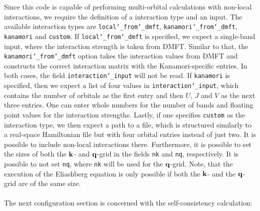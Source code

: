 \documentclass[../../main.tex]{subfiles}
\begin{document}
Since this code is capable of performing multi-orbital calculations with non-local interactions, we require the definition of a interaction type and an input. The available interaction types are \texttt{local\char`_from\char`_dmft}, \texttt{kanamori\char`_from\char`_dmft}, \texttt{kanamori} and \texttt{custom}. If \texttt{local\char`_from\char`_dmft} is specified, we expect a single-band input, where the interaction strength is taken from DMFT. Similar to that, the \texttt{kanamori\char`_from\char`_dmft} option takes the interaction values from DMFT and constructs the correct interaction matrix with the Kanamori-specific entries. In both cases, the field \texttt{interaction\char`_input} will not be read. If \texttt{kanamori} is specified, then we expect a list of four values in \texttt{interaction\char`_input}, which contains the number of orbitals as the first entry and then $U$, $J$ and $V$ as the next three entries. One can enter whole numbers for the number of bands and floating point values for the interaction strengths. Lastly, if one specifies \texttt{custom} as the interaction type, we then expect a path to a file, which is structured similarly to a real-space Hamiltonian file but with four orbital entries instead of just two. It is possible to include non-local interactions there. Furthermore, it is possible to set the sizes of both the $\textbf{k}$- and $\textbf{q}$-grid in the fields \texttt{nk} and \texttt{nq}, respectively. It is possible to not set \texttt{nq}, where \texttt{nk} will be used for the $\textbf{q}$-grid. Note, that the execution of the Eliashberg equation is only possible if both the $\textbf{k}$- and the $\textbf{q}$-grid are of the same size.
\\\\
The next configuration section is concerned with the self-consistency calculation:
\end{document}
